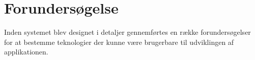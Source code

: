 \chapter{Forundersøgelse}
Inden systemet blev designet i detaljer gennemførtes en række forundersøgelser for at bestemme teknologier der kunne være brugerbare til udviklingen af applikationen.





